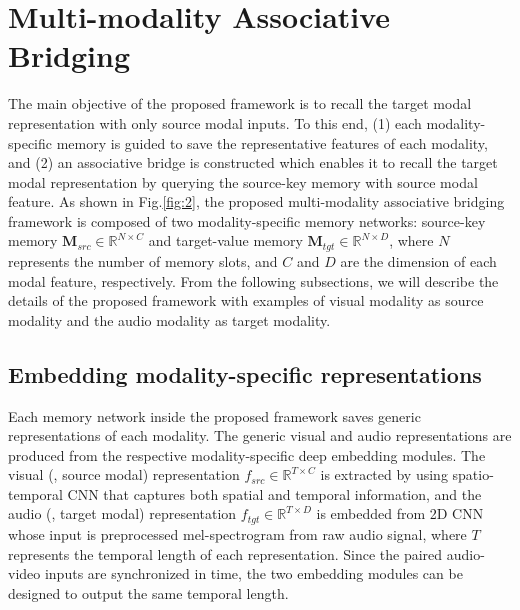 \documentclass[10pt,twocolumn,letterpaper]{article}
\begin{document}
\section{Multi-modality Associative Bridging}

The main objective of the proposed framework is to recall the target modal representation with only source modal inputs. To this end, (1) each modality-specific memory is guided to save the representative features of each modality, and (2) an associative bridge is constructed which enables it to recall the target modal representation by querying the source-key memory with source modal feature. As shown in Fig.\ref{fig:2}, the proposed multi-modality associative bridging framework is composed of two modality-specific memory networks: source-key memory $\mathbf{M}_{src}\in\mathbb{R}^{N \times C}$ and target-value memory $\mathbf{M}_{tgt}\in\mathbb{R}^{N \times D}$, where $N$ represents the number of memory slots, and $C$ and $D$ are the dimension of each modal feature, respectively. From the following subsections, we will describe the details of the proposed framework with examples of visual modality as source modality and the audio modality as target modality.

\subsection{Embedding modality-specific representations}
Each memory network inside the proposed framework saves generic representations of each modality. The generic visual and audio representations are produced from the respective modality-specific deep embedding modules. The visual (\ie, source modal) representation  $f_{src}\in\mathbb{R}^{T \times C}$ is extracted by using spatio-temporal CNN that captures both spatial and temporal information, and the audio (\ie, target modal) representation  $f_{tgt}\in\mathbb{R}^{T \times D}$ is embedded from 2D CNN whose input is preprocessed mel-spectrogram from raw audio signal, where $T$ represents the temporal length of each representation. Since the paired audio-video inputs are synchronized in time, the two embedding modules can be designed to output the same temporal length.
\end{document}
